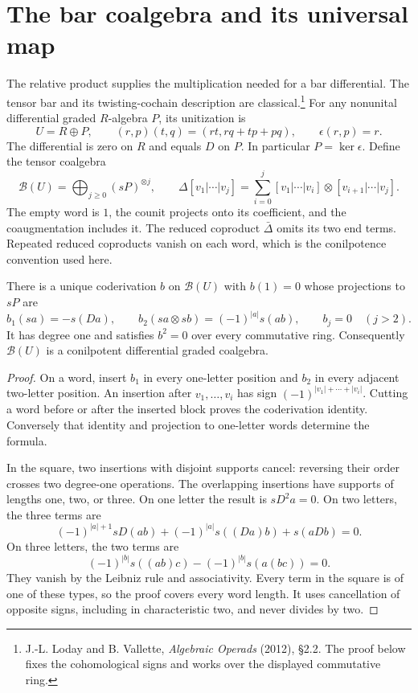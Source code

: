 \section{The bar coalgebra and its universal map}

The relative product supplies the multiplication needed for a bar
differential. The tensor bar and its twisting-cochain description are classical.\footnote{J.-L. Loday and B. Vallette, \emph{Algebraic Operads} (2012), \S2.2. The proof below fixes the cohomological signs and works over the displayed commutative ring.} For any nonunital differential graded $R$-algebra $P$,
its unitization is
\[
 U=R\oplus P,\qquad
 (r,p)(t,q)=(rt,rq+tp+pq),\qquad\epsilon(r,p)=r.
\]
The differential is zero on $R$ and equals $D$ on $P$. In particular
$P=\ker\epsilon$. Define the tensor coalgebra
\[
 \mathcal{B}(U)=\bigoplus_{j\ge0}(sP)^{\otimes j},\qquad
 \Delta[v_1|\cdots|v_j]
 =\sum_{i=0}^j[v_1|\cdots|v_i]\otimes[v_{i+1}|\cdots|v_j].
\]
The empty word is $1$, the counit projects onto its coefficient,
and the coaugmentation includes it. The reduced coproduct
$\bar\Delta$ omits its two end terms. Repeated reduced coproducts
vanish on each word, which is the conilpotence convention used here.

\begin{theorem}\label{v4-arith:relative-bar:thm:bar}
There is a unique coderivation $b$ on $\mathcal{B}(U)$ with $b(1)=0$
whose projections to $sP$ are
\[
 b_1(sa)=-s(Da),\qquad
 b_2(sa\otimes sb)=(-1)^{|a|}s(ab),\qquad b_j=0\quad(j>2).
\]
It has degree one and satisfies $b^2=0$ over every commutative ring.
Consequently $\mathcal{B}(U)$ is a conilpotent differential graded coalgebra.
\end{theorem}
\begin{proof}
On a word, insert $b_1$ in every one-letter position and $b_2$ in
every adjacent two-letter position. An insertion after $v_1,\ldots,v_i$
has sign $(-1)^{|v_1|+\cdots+|v_i|}$. Cutting a word before or after
the inserted block proves the coderivation identity. Conversely that
identity and projection to one-letter words determine the formula.

In the square, two insertions with disjoint supports cancel: reversing
their order crosses two degree-one operations. The overlapping
insertions have supports of lengths one, two, or three. On one letter
the result is $sD^2a=0$. On two letters, the three terms are
\[
 (-1)^{|a|+1}sD(ab)
 +(-1)^{|a|}s((Da)b)+s(aDb)=0.
\]
On three letters, the two terms are
\[
 (-1)^{|b|}s((ab)c)-(-1)^{|b|}s(a(bc))=0.
\]
They vanish by the Leibniz rule and associativity. Every term in the
square is of one of these types, so the proof covers every word length.
It uses cancellation of opposite signs, including in characteristic two,
and never divides by two.
\end{proof}

